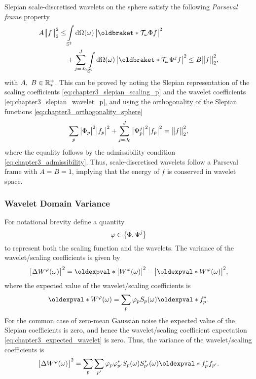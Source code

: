 Slepian scale-discretised wavelets on the sphere satisfy the following \emph{Parseval frame} property
%
\begin{align}
	A\norm{f}^{2} \leq
	 & \integrateSphere{\omega} \abs{\braket{\translation{\omega}\Phi}{f}}^{2} \nonumber         \\
	 & + \waveletSum \integrateSphere{\omega} \abs{\braket{\translation{\omega}\Psi^{j}}{f}}^{2}
	\leq B\norm{f}^{2},
\end{align}
%
with \(A,\ B \in \mathbb{R}_{\ast}^{+}{}\).
This can be proved by noting the Slepian representation of the scaling coefficients \cref{eq:chapter3_slepian_scaling_p} and the wavelet coefficients \cref{eq:chapter3_slepian_wavelet_p}, and using the orthogonality of the Slepian functions \cref{eq:chapter3_orthogonality_sphere}
%
\begin{equation}
	\sum\limits_{p} \big\lvert{\Phi}_{p}\big\rvert^{2} \big\lvert{f}_{p}\big\rvert^{2}
	+ \sum\limits_{j=J_{0}}^{J} \big\lvert{\Psi}_{p}^{j}\big\rvert^{2} \big\lvert{f}_{p}\big\rvert^{2}
	= {\big\lVert f\big\rVert}_{2}^{2},
\end{equation}
%
where the equality follows by the admissibility condition \cref{eq:chapter3_admissibility}.
Thus, scale-discretised wavelets follow a Parseval frame with \(A = B = 1\), implying that the energy of \(f\) is conserved in wavelet space.

\subsubsection{Wavelet Domain Variance}

For notational brevity define a quantity
%
\begin{equation}\label{eq:chapter3_scaling_and_wavelet}
	\varphi \in \{\Phi,\Psi^{j}\}
\end{equation}
%
to represent both the scaling function and the wavelets.
The variance of the wavelet/scaling coefficients is given by
%
\begin{equation}
	\variance{\pixel{W^{\varphi}}}
	= \expval{\abs{\pixel{W^{\varphi}}}^{2}}
	-\abs{\expval{\pixel{W^{\varphi}}}}^{2},
\end{equation}
%
where the expected value of the wavelet/scaling coefficients is
%
\begin{equation}\label{eq:chapter3_expected_wavelet}
	\expval{\pixel{W^{\varphi}}}
	= \slepianSum \slepian{\varphi} \pixel{\slepian{S}} \expval{\conj{\slepian{f}}}.
\end{equation}
%
For the common case of zero-mean Gaussian noise the expected value of the Slepian coefficients is zero, and hence the wavelet/scaling coefficient expectation \cref{eq:chapter3_expected_wavelet} is zero.
Thus, the variance of the wavelet/scaling coefficients is
%
\begin{equation}\label{eq:chapter3_slepian_isotropic_noise}
	\variance{\pixel{W^{\varphi}}}
	= \slepianSum \slepianSum['] \slepian{\varphi} \conj{\slepian[']{\varphi}} \pixel{\slepian{S}} \pixel{\conj{\slepian[']{S}}} \expval{\conj{\slepian{f}} \slepian[']{f}}.
\end{equation}

